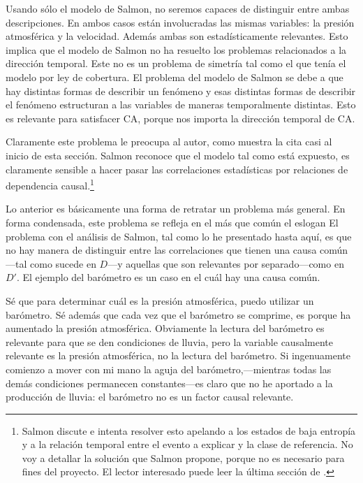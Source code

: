 Usando sólo el modelo de Salmon, no seremos capaces de
distinguir entre ambas descripciones. En ambos casos están
involucradas las mismas variables: la presión atmosférica y
la velocidad. Además ambas son estadísticamente relevantes. 
Esto implica que el modelo de Salmon no ha resuelto los
problemas relacionados a la dirección
temporal. Este no es un problema de simetría tal como el que
tenía el modelo por ley de cobertura. El problema del
modelo de Salmon se debe a que hay distintas formas de
describir un fenómeno y esas distintas formas de describir
el fenómeno estructuran a las variables de maneras
temporalmente distintas. Esto es relevante para satisfacer 
CA, porque nos importa la dirección temporal de CA.  


Claramente este problema le preocupa al autor, como muestra
la cita casi al inicio de esta sección. Salmon reconoce que
el modelo tal como está expuesto, es claramente sensible a
hacer pasar las correlaciones estadísticas por relaciones
de dependencia causal.\footnote{
  Salmon discute e intenta resolver esto apelando a los
  estados de baja entropía y a la relación temporal entre el
  evento a explicar y la clase de referencia. No voy a
  detallar la solución que Salmon propone,	porque no es
  necesario para fines del proyecto. El lector	interesado
  puede leer la última sección de \parencite{Salmon1970}. 
}

Lo anterior es básicamente una forma de retratar un problema
más general. En forma condensada, este problema se refleja
en el más que común el eslogan  El problema con el análisis de Salmon, tal como
lo he presentado hasta aquí, es que no hay manera de
distinguir entre las correlaciones que tienen una causa
común---tal como sucede en $D$---y aquellas que son
relevantes por separado---como en $D'$. El ejemplo del
barómetro es un caso en el cuál hay una causa común. 

Sé que para determinar cuál es la presión atmosférica, puedo
utilizar un barómetro. Sé además que cada vez que el
barómetro se comprime, es porque ha aumentado la presión
atmosférica. Obviamente la lectura del barómetro es
relevante para que se den condiciones de lluvia, pero la
variable causalmente relevante es la presión atmosférica, no
la lectura del barómetro. Si ingenuamente comienzo a mover
con mi mano la aguja del barómetro,---mientras todas las
demás condiciones permanecen constantes---es claro que no
he aportado a la producción de lluvia: el barómetro no es un
factor causal relevante.

